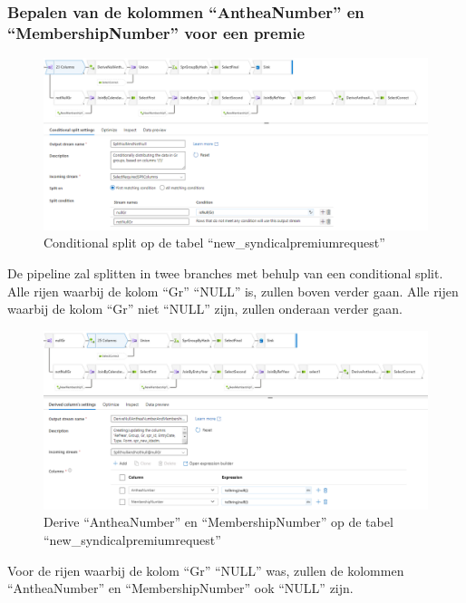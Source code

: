 \subsubsection{Bepalen van de kolommen ``AntheaNumber'' en ``MembershipNumber'' voor een premie}

\begin{figure}[H]
    \centering
    \includegraphics[width=1\textwidth]{./graphics/adf/member_1.png}
    \caption{Conditional split op de tabel ``new\_syndicalpremiumrequest''}
\end{figure}

De pipeline zal splitten in twee branches met behulp van een conditional split. Alle rijen waarbij de kolom ``Gr'' ``NULL'' is, zullen boven verder gaan. Alle rijen waarbij de kolom ``Gr'' niet ``NULL'' zijn, zullen onderaan verder gaan.

\begin{figure}[H]
    \centering
    \includegraphics[width=1\textwidth]{./graphics/adf/member_2.png}
    \caption{Derive ``AntheaNumber'' en ``MembershipNumber'' op de tabel ``new\_syndicalpremiumrequest''}
\end{figure}

Voor de rijen waarbij de kolom ``Gr'' ``NULL'' was, zullen de kolommen ``AntheaNumber'' en ``MembershipNumber'' ook ``NULL'' zijn.

